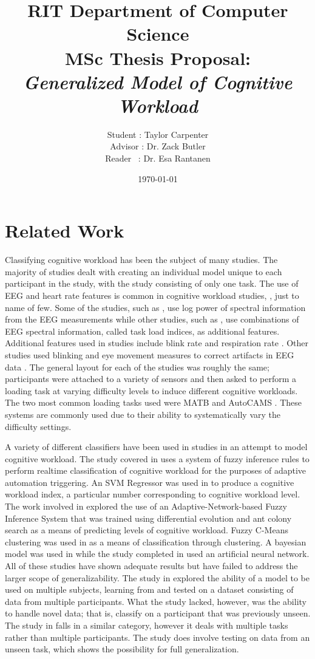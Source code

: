 \documentclass[11pt]{artikel3}
\title{RIT Department of Computer Science\\MSc Thesis Proposal:\\\emph{Generalized Model of Cognitive Workload}}
\author{Student : Taylor Carpenter\\Advisor : Dr. Zack Butler\\Reader  \ : Dr. Esa Rantanen}
\date{\today}
\begin{document}
\maketitle

\section{Related Work}
Classifying cognitive workload has been the subject of many studies. The majority of studies dealt with creating an individual model unique to each participant in the study, with the study consisting of only one task. The use of EEG and heart rate features is common in cognitive workload studies, \cite{Wang_R, Zhang, Wilson, Yang}, just to name of few. Some of the studies, such as \cite{Wilson}, use log power of spectral information from the EEG measurements while other studies, such as \cite{Zhang}, use combinations of EEG spectral information, called task load indices, as additional features. Additional features used in studies include blink rate \cite{Wilson_2002} and respiration rate \cite{Wilson}. Other studies used blinking and eye movement measures to correct artifacts in EEG data \cite{Wang_R}. The general layout for each of the studies was roughly the same; participants were attached to a variety of sensors and then asked to perform a loading task at varying difficulty levels to induce different cognitive workloads. The two most common loading tasks used were MATB \cite{Estepp} and AutoCAMS \cite{Lorenz}. These systems are commonly used due to their ability to systematically vary the difficulty settings. 

A variety of different classifiers have been used in studies in an attempt to model cognitive workload. The study covered in \cite{Yang} uses a system of fuzzy inference rules to perform realtime classification of cognitive workload for the purposes of adaptive automation triggering. An SVM Regressor was used in \cite{Ke} to produce a cognitive workload index, a particular number corresponding to cognitive workload level. The work involved in \cite{Wang_R} explored the use of an Adaptive-Network-based Fuzzy Inference System that was trained using differential evolution and ant colony search as a means of predicting levels of cognitive workload. Fuzzy C-Means clustering was used in \cite{Zhang} as a means of classification through clustering. A bayesian model was used in \cite{Wang_Z} while the study completed in \cite{Wilson} used an artificial neural network. All of these studies have shown adequate results but have failed to address the larger scope of generalizability. The study in \cite{Wang_Z} explored the ability of a model to be used on multiple subjects, learning from and tested on a dataset consisting of data from multiple participants. What the study lacked, however, was the ability to handle novel data; that is, classify on a participant that was previously unseen. The study in \cite{Wang_Z} falls in a similar category, however it deals with multiple tasks rather than multiple participants. The study does involve testing on data from an unseen task, which shows the possibility for full generalization.
\end{document}
